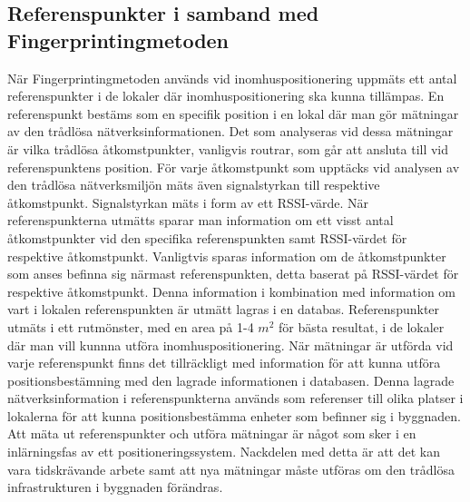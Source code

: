 \documentclass[swedish, a4paper,12pt]{article}
\begin{document}
\subsection{Referenspunkter i samband med Fingerprintingmetoden}\label{referenspunkter}
När Fingerprintingmetoden används vid inomhuspositionering uppmäts ett antal referenspunkter i de lokaler där inomhuspositionering ska kunna tillämpas\cite{yiu2017wireless}\cite{IP1}.
En referenspunkt bestäms som en specifik position i en lokal där man gör mätningar av den trådlösa nätverksinformationen. Det som analyseras vid dessa mätningar är vilka trådlösa åtkomstpunkter, vanligvis routrar, som går att ansluta till vid referenspunktens position. För varje åtkomstpunkt som upptäcks vid analysen av den trådlösa nätverksmiljön mäts även signalstyrkan till respektive åtkomstpunkt. Signalstyrkan mäts i form av ett RSSI-värde. När referenspunkterna utmätts sparar man information om ett visst antal åtkomstpunkter vid den specifika referenspunkten samt RSSI-värdet för respektive åtkomstpunkt\cite{IP1}. Vanligtvis sparas information om de åtkomstpunkter som anses befinna sig närmast referenspunkten, detta baserat på RSSI-värdet för respektive åtkomstpunkt\cite{IP1}.
Denna information i kombination med information om vart i lokalen referenspunkten är utmätt lagras i en databas. Referenspunkter utmäts i ett rutmönster, med en area på 1-4 $m^2$ för bästa resultat\cite{yiu2017wireless}, i de lokaler där man vill kunnna utföra inomhuspositionering\cite{IP1}. När mätningar är utförda vid varje referenspunkt finns det tillräckligt med information för att kunna utföra positionsbestämning med den lagrade informationen i databasen. Denna lagrade nätverksinformation i referenspunkterna används som referenser till olika platser i lokalerna för att kunna positionsbestämma enheter som befinner sig i byggnaden\cite{yiu2017wireless}\cite{IP1}.
Att mäta ut referenspunkter och utföra mätningar är något som sker i en inlärningsfas av ett positioneringssystem\cite{tian2013fingerprint}. Nackdelen med detta är att det kan vara tidskrävande arbete samt att nya mätningar måste utföras om den trådlösa infrastrukturen i byggnaden förändras\cite{IP1}.
\end{document}
